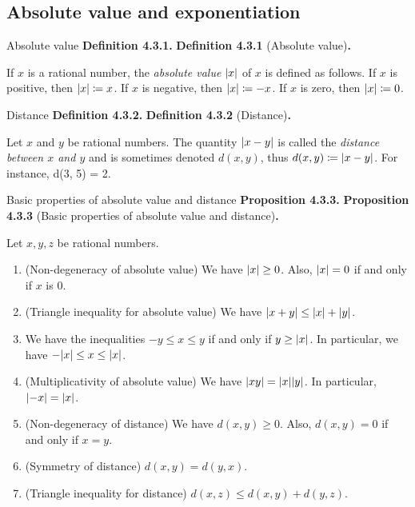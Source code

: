 \documentclass[12pt]{article}
\newenvironment{df}[2][\relax]{
\vspace{4mm}
    \noindent\setlength{\parskip}{1em}%
    \ifx#1\relax%
        \textbf{#2. }%
    \else%
        \textbf{#2} (#1)\textbf{. }%
    \fi%
    \ignorespaces%
}{}
\theoremstyle{remark}
\begin{document}
\subsection{Absolute value and exponentiation}

\begin{df}[Absolute value]{Definition 4.3.1}
    If $x$ is a rational number, the \emph{absolute value} $\abs{x}$ of $x$ is defined as follows.
    If $x$ is positive, then $\abs{x} \coloneqq x$.
    If $x$ is negative, then $\abs{x} \coloneqq -x$.
    If $x$ is zero, then $\abs{x} \coloneqq 0$.
\end{df}


\begin{df}[Distance]{Definition 4.3.2}
    Let $x$ and $y$ be rational numbers.
    The quantity $\abs{x - y}$ is called the \emph{distance between $x$ and $y$} and is sometimes denoted $d(x, y)$, thus $d(x, y) \coloneqq \abs{x - y}$.
    For instance, d(3, 5) = 2.
\end{df}


\begin{df}[Basic properties of absolute value and distance]{Proposition 4.3.3}
    Let $x, y, z$ be rational numbers.
    \begin{enumerate}[topsep=0mm,label=(\alph*)]
        \item (Non-degeneracy of absolute value)
            We have $\abs{x} \ge 0$.
            Also, $\abs{x} = 0$ if and only if $x$ is $0$.

        \item (Triangle inequality for absolute value)
            We have $\abs{x+y} \le \abs{x} + \abs{y}$.

        \item We have the inequalities $-y \le x \le y$ if and only if $y \ge \abs{x}$.
            In particular, we have $-\abs{x} \le x \le \abs{x}$.

        \item (Multiplicativity of absolute value)
            We have $\abs{xy} = \abs{x}\abs{y}$.
            In particular, $\abs{-x} = \abs{x}$.

        \item (Non-degeneracy of distance)
            We have $d(x, y) \ge 0$.
            Also, $d(x, y) = 0$ if and only if $x = y$.

        \item (Symmetry of distance)
            $d(x, y)= d(y, x)$.

        \item (Triangle inequality for distance)
            $d(x, z) \le d(x, y) + d(y, z)$.
    \end{enumerate}
\end{df}
\end{document}
